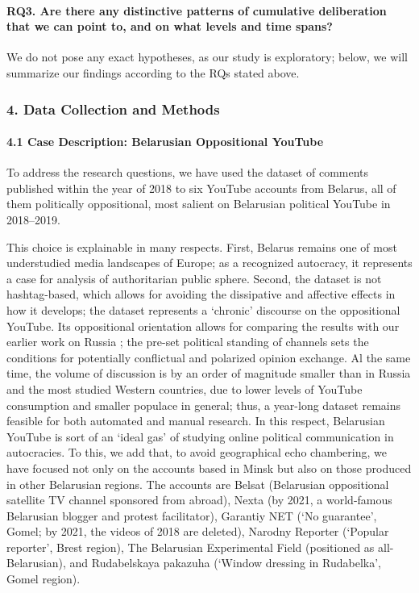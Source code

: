 \paragraph{RQ3. Are there any distinctive patterns of cumulative deliberation that we can point to, and on what levels and time spans?}

We do not pose any exact hypotheses, as our study is exploratory; below, we will summarize our findings according to the RQs stated above.

\subsubsection{4. Data Collection and Methods}

\paragraph{4.1 Case Description: Belarusian Oppositional YouTube}

To address the research questions, we have used the dataset of comments published within the year of 2018 to six YouTube accounts from Belarus, all of them politically oppositional, most salient on Belarusian political YouTube in 2018--2019.

This choice is explainable in many respects. First, Belarus remains one of most understudied media landscapes of Europe; as a recognized autocracy, it represents a case for analysis of authoritarian public sphere. Second, the dataset is not hashtag-based, which allows for avoiding the dissipative and affective effects \cite{Papacharissi} in how it develops; the dataset represents a ‘chronic’ discourse on the oppositional YouTube. Its oppositional orientation allows for comparing the results with our earlier work on Russia \cite{BodrunovaLitvinenkoBlekanov2021}; the pre-set political standing of channels sets the conditions for potentially conflictual and polarized opinion exchange. Al the same time, the volume of discussion is by an order of magnitude smaller than in Russia and the most studied Western countries, due to lower levels of YouTube consumption and smaller populace in general; thus, a year-long dataset remains feasible for both automated and manual research. In this respect, Belarusian YouTube is sort of an ‘ideal gas’ of studying online political communication in autocracies. To this, we add that, to avoid geographical echo chambering, we have focused not only on the accounts based in Minsk but also on those produced in other Belarusian regions. The accounts are Belsat (Belarusian oppositional satellite TV channel sponsored from abroad), Nexta (by 2021, a world-famous Belarusian blogger and protest facilitator), Garantiy NET (‘No guarantee’, Gomel; by 2021, the videos of 2018 are deleted), Narodny Reporter (‘Popular reporter’, Brest region), The Belarusian Experimental Field (positioned as all-Belarusian), and Rudabelskaya pakazuha (‘Window dressing in Rudabelka’, Gomel region).


